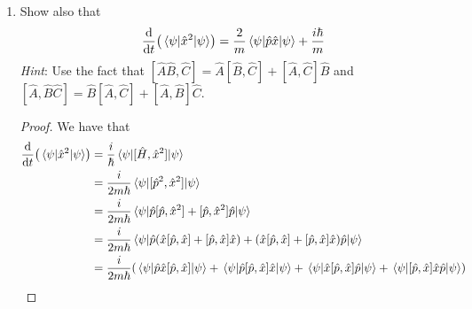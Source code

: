 \documentclass[../psets.tex]{subfiles}
\begin{document}
\begin{enumerate}
\begin{enumerate}
\begin{proof}
            We have from Lecture 1.2 that
            \begin{equation*}
                \dv{t}(\ev{\hat{x}}{\psi}) = \frac{\ev{\hat{p}}{\psi}}{m}
            \end{equation*}
            Now part (a) tells us that $\ev{\hat{p}}{\psi}$ is time-independent, which means that if $\ev{\hat{p}}{\psi}=p_0$ at $t=0$, then $\ev{\hat{p}}{\psi}=p_0$ for all time $t$. Thus,
            \begin{equation*}
                \boxed{\dv{t}(\ev{\hat{x}}{\psi}) = \frac{p_0}{m}}
            \end{equation*}
            It follows by integrating that
            \begin{align*}
                \int_0^t\dv{t}(\ev{\hat{x}}{\psi})\dd{t} &= \int_0^t\frac{p_0}{m}\dd{t'}\\
                \ev{\hat{x}}{\psi}(t)-\ev{\hat{x}}{\psi}(0) &= \frac{p_0}{m}t-\frac{p_0}{m}0\\
                \ev{\hat{x}}{\psi}(t)-x_0 &= \frac{p_0t}{m}\\
                \ev{\hat{x}}{\psi}(t) &= \frac{p_0t}{m}+x_0
            \end{align*}
            as desired.
        \end{proof}
        \pagebreak
        \item Show also that
        \begin{equation}
            \dv{t}(\ev{\hat{x}^2}{\psi}) = \frac{2}{m}\ev{\hat{p}\hat{x}}{\psi}+\frac{i\hbar}{m}
        \end{equation}
        \emph{Hint}: Use the fact that $[\hat{A}\hat{B},\hat{C}]=\hat{A}[\hat{B},\hat{C}]+[\hat{A},\hat{C}]\hat{B}$ and $[\hat{A},\hat{B}\hat{C}]=\hat{B}[\hat{A},\hat{C}]+[\hat{A},\hat{B}]\hat{C}$.
        \begin{proof}
            We have that
            \begin{align*}
                \dv{t}(\ev{\hat{x}^2}{\psi}) &= \frac{i}{\hbar}\ev{[\hat{H},\hat{x}^2]}{\psi}\\
                &= \frac{i}{2m\hbar}\ev{[\hat{p}^2,\hat{x}^2]}{\psi}\\
                &= \frac{i}{2m\hbar}\ev{\hat{p}[\hat{p},\hat{x}^2]+[\hat{p},\hat{x}^2]\hat{p}}{\psi}\\
                &= \frac{i}{2m\hbar}\ev{\hat{p}(\hat{x}[\hat{p},\hat{x}]+[\hat{p},\hat{x}]\hat{x})+(\hat{x}[\hat{p},\hat{x}]+[\hat{p},\hat{x}]\hat{x})\hat{p}}{\psi}\\
                &= \frac{i}{2m\hbar}(\ev{\hat{p}\hat{x}[\hat{p},\hat{x}]}{\psi}+\ev{\hat{p}[\hat{p},\hat{x}]\hat{x}}{\psi}+\ev{\hat{x}[\hat{p},\hat{x}]\hat{p}}{\psi}+\ev{[\hat{p},\hat{x}]\hat{x}\hat{p}}{\psi})\\

\end{align*}
\end{proof}
\end{enumerate}
\end{enumerate}
\end{document}
